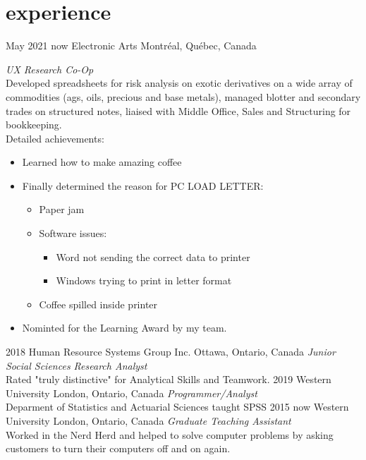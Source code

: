 \documentclass[]{k-cv} %
\begin{document}
\section{experience}

\begin{entrylist}
\entry
{May 2021 \to now}
{Electronic Arts}
{Montréal, Québec, Canada}
{\emph{UX Research Co-Op} \\
Developed spreadsheets for risk analysis on exotic derivatives on a wide array 
of commodities (ags, oils, precious and base metals), managed blotter and 
secondary trades on structured notes, liaised with Middle Office, Sales and 
Structuring for bookkeeping. \\
Detailed achievements:
\begin{itemize}
\item Learned how to make amazing coffee
\item Finally determined the reason for \textsc{PC LOAD LETTER}:
\begin{itemize}
\item Paper jam
\item Software issues:
\begin{itemize}
\item Word not sending the correct data to printer
\item Windows trying to print in letter format
\end{itemize}
\item Coffee spilled inside printer
\end{itemize}
\item Nominted for the Learning Award by my team.
\end{itemize}}
\entry
{2018 }
{Human Resource Systems Group Inc.}
{Ottawa, Ontario, Canada}
{\emph{Junior Social Sciences Research Analyst} \\
Rated "truly distinctive" for Analytical Skills and Teamwork.}
\entry
{2019}
{Western University}
{London, Ontario, Canada}
{\emph{Programmer/Analyst} \\
Deparment of Statistics and Actuarial Sciences taught SPSS}
\entry
{2015 \to now}
{Western University}
{London, Ontario, Canada}
{\emph{Graduate Teaching Assistant} \\
Worked in the Nerd Herd and helped to solve computer problems by asking 
customers to turn their computers off and on again.}
\end{entrylist}
\end{document}

